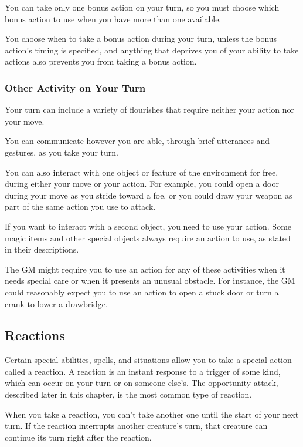You can take only one bonus action on your turn, so you must choose which bonus action to use when you have more than one available.

You choose when to take a bonus action during your turn, unless the bonus action's timing is specified, and anything that deprives you of your ability to take actions also prevents you from taking a bonus action.

\subsubsection{Other Activity on Your Turn}

Your turn can include a variety of flourishes that require neither your action nor your move.

You can communicate however you are able, through brief utterances and gestures, as you take your turn.

You can also interact with one object or feature of the environment for free, during either your move or your action. For example, you could open a door during your move as you stride toward a foe, or you could draw your weapon as part of the same action you use to attack.

If you want to interact with a second object, you need to use your action. Some magic items and other special objects always require an action to use, as stated in their descriptions.

The GM might require you to use an action for any of these activities when it needs special care or when it presents an unusual obstacle. For instance, the GM could reasonably expect you to use an action to open a stuck door or turn a crank to lower a drawbridge.

\subsection{Reactions}

Certain special abilities, spells, and situations allow you to take a special action called a reaction. A reaction is an instant response to a trigger of some kind, which can occur on your turn or on someone else's. The opportunity attack, described later in this chapter, is the most common type of reaction.

When you take a reaction, you can't take another one until the start of your next turn. If the reaction interrupts another creature's turn, that creature can continue its turn right after the reaction.

